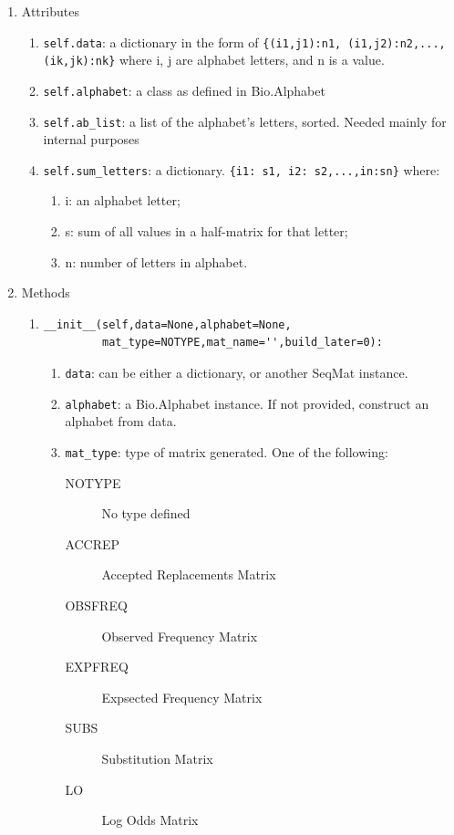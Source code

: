 \documentclass{report}
\begin{document}
\begin{enumerate}
  \item Attributes

  \begin{enumerate}
    \item \verb|self.data|: a dictionary in the form of \verb|{(i1,j1):n1, (i1,j2):n2,...,(ik,jk):nk}| where i, j are alphabet letters, and n is a value.

    \item \verb|self.alphabet|: a class as defined in Bio.Alphabet

    \item \verb|self.ab_list|: a list of the alphabet's letters, sorted. Needed mainly for internal purposes

    \item \verb|self.sum_letters|: a dictionary. \verb|{i1: s1, i2: s2,...,in:sn}| where:
    \begin{enumerate}
      \item i: an alphabet letter; 
      \item s: sum of all values in a half-matrix for that letter; 
      \item n: number of letters in alphabet.
    \end{enumerate}
  \end{enumerate}

  \item Methods

  \begin{enumerate}

    \item 
\begin{verbatim} 
__init__(self,data=None,alphabet=None,
         mat_type=NOTYPE,mat_name='',build_later=0):
\end{verbatim}

    \begin{enumerate}

      \item \verb|data|: can be either a dictionary, or another SeqMat instance.
      \item \verb|alphabet|: a Bio.Alphabet instance. If not provided, construct an alphabet from data.

      \item \verb|mat_type|: type of matrix generated. One of the following:

      \begin{description}
        \item[NOTYPE]     No type defined
        \item[ACCREP]     Accepted Replacements Matrix
        \item[OBSFREQ]    Observed Frequency Matrix 
        \item[EXPFREQ]    Expsected Frequency Matrix
        \item[SUBS]       Substitution Matrix       
        \item[LO]         Log Odds Matrix
      \end{description}


\end{enumerate}
\end{enumerate}
\end{enumerate}
\end{document}
